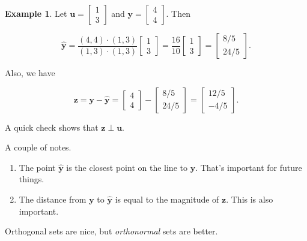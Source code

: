 \documentclass[
]{book}
\theoremstyle{definition}
\theoremstyle{definition}
\newtheorem{example}{Example}[chapter]
\theoremstyle{definition}
\theoremstyle{definition}
\theoremstyle{remark}
\begin{document}
\begin{examplebox}

\begin{example}
Let \(\mathbf{u}=\begin{bmatrix}1\\3\end{bmatrix}\) and \(\mathbf{y}=\begin{bmatrix}4\\4\end{bmatrix}\). Then

\[\hat{\mathbf{y}}=\frac{(4,4)\cdot (1,3)}{(1,3)\cdot(1,3)}\begin{bmatrix}1\\3\end{bmatrix}=\frac{16}{10}\begin{bmatrix}1\\3\end{bmatrix}=\begin{bmatrix}8/5\\24/5\end{bmatrix}.\]

Also, we have

\[\mathbf{z}=\mathbf{y}-\hat{\mathbf{y}}=\begin{bmatrix}4\\4\end{bmatrix}-\begin{bmatrix}8/5\\24/5\end{bmatrix}=\begin{bmatrix}12/5\\-4/5\end{bmatrix}.\]

A quick check shows that \(\mathbf{z}\perp \mathbf{u}\).
\end{example}

\end{examplebox}

A couple of notes.

\begin{enumerate}
\def\labelenumi{\arabic{enumi}.}
\item
  The point \(\hat{\mathbf{y}}\) is the closest point on the line to \(\mathbf{y}\). That's important for future things.
\item
  The distance from \(\mathbf{y}\) to \(\hat{\mathbf{y}}\) is equal to the magnitude of \(\mathbf{z}\). This is also important.
\end{enumerate}

Orthogonal sets are nice, but \emph{orthonormal} sets are better.
\end{document}
